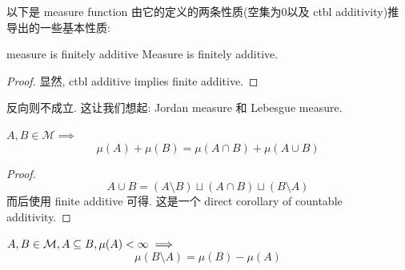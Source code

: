 \documentclass[lang=cn,11pt]{elegantbook}
\begin{document}
\noindent 以下是 measure function 由它的定义的两条性质(空集为0以及 ctbl additivity)推导出的一些基本性质:

\begin{lemma}{measure is finitely additive}
    Measure is finitely additive.
\end{lemma}
\begin{proof}
    显然, ctbl additive implies finite additive.
\end{proof}

\begin{remark}
    反向则不成立. 这让我们想起: Jordan measure 和 Lebesgue measure. 
\end{remark}

\begin{lemma}
    $A,B\in \mathcal{M} \implies$
    $$
    \mu(A) + \mu(B) = \mu(A \cap B) + \mu(A \cup B)
    $$
\end{lemma}
\begin{proof}
    $$A \cup B = (A \setminus B) \sqcup (A\cap B) \sqcup (B\setminus A)$$
    而后使用 finite additive 可得. 这是一个 direct corollary of countable additivity.
\end{proof}

\begin{corollary}
    $A,B\in \mathcal{M}, A\subseteq B, \mu(A) < \infty \implies$
    $$
    \mu(B\setminus A) = \mu(B) - \mu(A)
    $$
\end{corollary}
\end{document}

